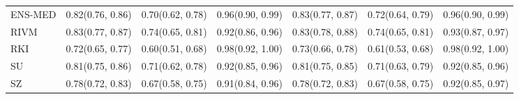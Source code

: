 \begin{tabular}{l p{} p{} p{} p{} p{} p{}}
ENS-MED & {0.82\newline(0.76, 0.86)} & {0.70\newline(0.62, 0.78)} & {0.96\newline(0.90, 0.99)} & {0.83\newline(0.77, 0.87)} & {0.72\newline(0.64, 0.79)} & {0.96\newline(0.90, 0.99)} \\
RIVM & {0.83\newline(0.77, 0.87)} & {0.74\newline(0.65, 0.81)} & {0.92\newline(0.86, 0.96)} & {0.83\newline(0.78, 0.88)} & {0.74\newline(0.65, 0.81)} & {0.93\newline(0.87, 0.97)} \\
RKI & {0.72\newline(0.65, 0.77)} & {0.60\newline(0.51, 0.68)} & {0.98\newline(0.92, 1.00)} & {0.73\newline(0.66, 0.78)} & {0.61\newline(0.53, 0.68)} & {0.98\newline(0.92, 1.00)} \\
SU & {0.81\newline(0.75, 0.86)} & {0.71\newline(0.62, 0.78)} & {0.92\newline(0.85, 0.96)} & {0.81\newline(0.75, 0.85)} & {0.71\newline(0.63, 0.79)} & {0.92\newline(0.85, 0.96)} \\
SZ & {0.78\newline(0.72, 0.83)} & {0.67\newline(0.58, 0.75)} & {0.91\newline(0.84, 0.96)} & {0.78\newline(0.72, 0.83)} & {0.67\newline(0.58, 0.75)} & {0.92\newline(0.85, 0.97)} \\
\bottomrule
\end{tabular}
